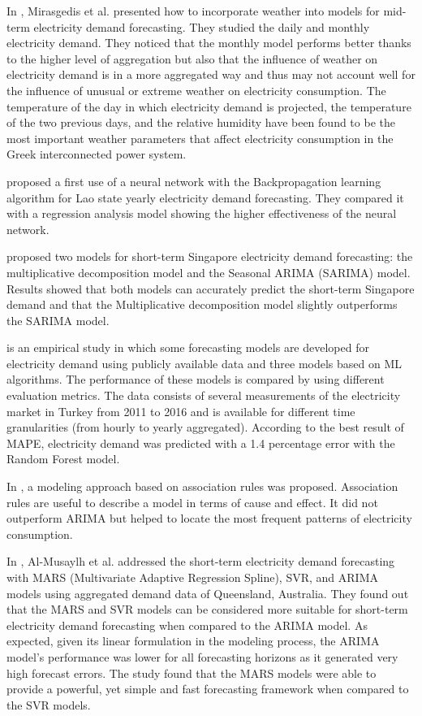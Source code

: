 In \cite{MIRASGEDIS2006208}, Mirasgedis et al. presented how to incorporate weather into models for mid-term electricity demand forecasting.
They studied the daily and monthly electricity demand.
They noticed that the monthly model performs better thanks to the higher level of aggregation but also that the influence of weather on electricity demand is in a more aggregated way and thus may not account well for the influence of unusual or extreme weather on electricity consumption.
The temperature of the day in which electricity demand is projected, the temperature of the two previous days, and the relative humidity have been found to be the most important weather parameters that affect electricity consumption in the Greek interconnected power system.

\cite{5686767} proposed a first use of a neural network with the Backpropagation learning algorithm for Lao state yearly electricity demand forecasting.
They compared it with a regression analysis model showing the higher effectiveness of the neural network.

\cite{5518553} proposed two models for short-term Singapore electricity demand forecasting: the multiplicative decomposition model and the Seasonal ARIMA (SARIMA) model.
Results showed that both models can accurately predict the short-term Singapore demand and that the Multiplicative decomposition model slightly outperforms the SARIMA model.

\cite{8093428} is an empirical study in which some forecasting models are developed for electricity demand using publicly available data and three models based on ML algorithms.
The performance of these models is compared by using different evaluation metrics.
The data consists of several measurements of the electricity market in Turkey from 2011 to 2016 and is available for different time granularities (from hourly to yearly aggregated).
According to the best result of MAPE, electricity demand was predicted with a 1.4 percentage error with the Random Forest model.

In \cite{9046493}, a modeling approach based on association rules was proposed.
Association rules are useful to describe a model in terms of cause and effect.
It did not outperform ARIMA but helped to locate the most frequent patterns of electricity consumption.

In \cite{ALMUSAYLH20181}, Al-Musaylh et al. addressed the short-term electricity demand forecasting with MARS (Multivariate Adaptive Regression Spline), SVR, and ARIMA models using aggregated demand data of Queensland, Australia.
They found out that the MARS and SVR models can be considered more suitable for short-term electricity demand forecasting when compared to the ARIMA model.
As expected, given its linear formulation in the modeling process, the ARIMA model’s performance was lower for all forecasting horizons as it generated very high forecast errors.
The study found that the MARS models were able to provide a powerful, yet simple and fast forecasting framework when compared to the SVR models.

